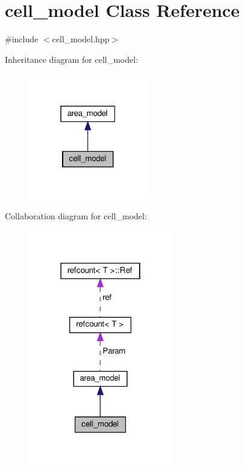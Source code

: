 \hypertarget{classcell__model}{}\section{cell\+\_\+model Class Reference}
\label{classcell__model}


{\ttfamily \#include $<$cell\+\_\+model.\+hpp$>$}



Inheritance diagram for cell\+\_\+model\+:
\nopagebreak
\begin{figure}[H]
\begin{center}
\leavevmode
\includegraphics[width=147pt]{dc/da8/classcell__model__inherit__graph}
\end{center}
\end{figure}


Collaboration diagram for cell\+\_\+model\+:
\nopagebreak
\begin{figure}[H]
\begin{center}
\leavevmode
\includegraphics[width=178pt]{df/de2/classcell__model__coll__graph}
\end{center}
\end{figure}
